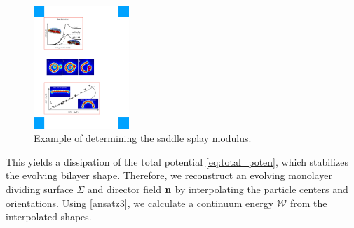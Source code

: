 \begin{figure}
\centerline{\includegraphics[width=0.32\textwidth]{Figures/SaddleSplayDiagram.pdf}}
  \vspace{-8pt}
\caption{\label{fig:saddle_splay} \footnotesize Example of determining the
  saddle splay modulus.}
\end{figure}
%
This yields a dissipation of the total potential \eqref{eq:total_poten}, which
stabilizes the evolving bilayer shape.
Therefore, we reconstruct an evolving monolayer dividing surface $\Sigma$ and director field ${\bf n}$ by
interpolating the particle centers and orientations. Using \eqref{ansatz3}, we calculate a continuum energy $\mathcal{W}$ from the interpolated shapes.


%
%

